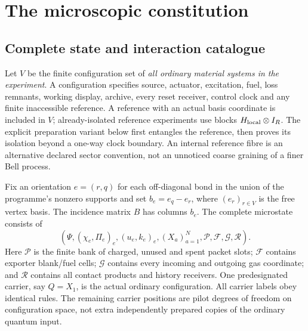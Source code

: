 \documentclass[11pt]{article}
\theoremstyle{definition}\newtheorem{definition}[theorem]{Definition}
\theoremstyle{remark}\newtheorem{remark}[theorem]{Remark}
\begin{document}
\section{The microscopic constitution}
\subsection{Complete state and interaction catalogue}
Let $V$ be the finite configuration set of \emph{all ordinary material systems in the experiment}. A configuration specifies source, actuator, excitation, fuel, loss remnants, working display, archive, every reset receiver, control clock and any finite inaccessible reference. A reference with an actual basis coordinate is included in $V$; already-isolated reference experiments use blocks $H_{\rm local}\otimes I_R$. The explicit preparation variant below first entangles the reference, then proves its isolation beyond a one-way clock boundary. An internal reference fibre is an alternative declared sector convention, not an unnoticed coarse graining of a finer Bell process.

Fix an orientation $e=(r,q)$ for each off-diagonal bond in the union of the programme's nonzero supports and set $b_e=e_q-e_r$, where $(e_r)_{r\in V}$ is the free vertex basis. The incidence matrix $B$ has columns $b_e$. The complete microstate consists of
\begin{equation}
 \left(\Psi,(\chi_e,\Pi_e)_e,(u_e,k_e)_e,
       (X_a)_{a=1}^N,\mathcal P,\mathcal F,\mathcal G,\mathcal R\right).
 \label{eq:microstate}
\end{equation}
Here $\mathcal P$ is the finite bank of charged, unused and spent packet slots; $\mathcal F$ contains exporter blank/fuel cells; $\mathcal G$ contains every incoming and outgoing gas coordinate; and $\mathcal R$ contains all contact products and history receivers. One predesignated carrier, say $Q=X_1$, is the actual ordinary configuration. All carrier labels obey identical rules. The remaining carrier positions are pilot degrees of freedom on configuration space, not extra independently prepared copies of the ordinary quantum input.
\end{document}
